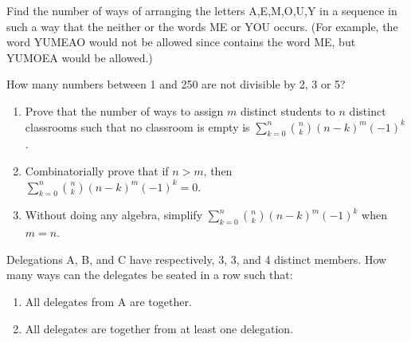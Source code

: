 \documentclass[12pt,letterpaper]{hmcpset}
\newcommand{\ds}{\displaystyle}
\renewcommand{\c}[2]{\binom{#1}{#2}}
\begin{document}

\begin{problem}[1]
    Find the number of ways of arranging the letters A,E,M,O,U,Y in a sequence in such a way that the neither or the words ME or YOU occurs.  (For example, the word YUMEAO would not be allowed since contains the word ME, but YUMOEA would be allowed.)
\end{problem}
\begin{solution}
    \vfill
\end{solution}
\newpage

\begin{problem}[2]
    How many numbers between 1 and 250 are not divisible by 2, 3 or 5?
\end{problem}
\begin{solution}
    \vfill
\end{solution}
\newpage

\begin{problem}[3]
    \begin{enumerate}
        \item Prove that the number of ways to assign $m$ distinct students to $n$ distinct classrooms such that no classroom is empty is $\ds\sum_{k=0}^n\c{n}{k}(n-k)^m(-1)^k$.
        \item Combinatorially prove that if $n>m$, then $\ds\sum_{k=0}^n\c{n}{k}(n-k)^m(-1)^k=0$.
        \item Without doing any algebra, simplify $\ds\sum_{k=0}^n\c{n}{k}(n-k)^m(-1)^k$ when $m=n$.
    \end{enumerate}
\end{problem}
\begin{solution}
    \vfill
\end{solution}
\newpage

\begin{problem}[4]
    Delegations A, B, and C have respectively, 3, 3, and 4 distinct members.  How many ways can the delegates be seated in a row such that:
    \begin{enumerate}
        \item All delegates from A are together.
        \item All delegates are together from at least one delegation.
    \end{enumerate}
\end{problem}
\begin{solution}
    \vfill
\end{solution}
\newpage
\end{document}

